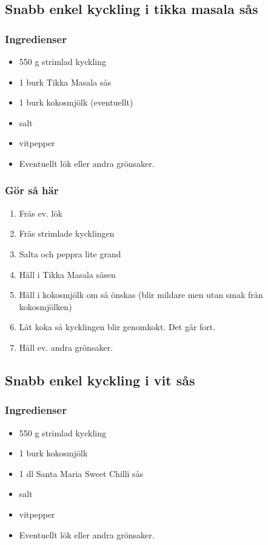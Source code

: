 \documentclass[a4paper,11pt,twocolumn]{article}
\begin{document}
\subsection{Snabb enkel kyckling i tikka masala sås}
\subsubsection*{Ingredienser}
\begin{itemize}[noitemsep]
    \item 550 g strimlad kyckling
    \item 1 burk Tikka Masala sås
    \item 1 burk kokosmjölk (eventuellt)
    \item salt
    \item vitpepper
    \item Eventuellt lök eller andra grönsaker.
\end{itemize}
\subsubsection*{Gör så här}
\begin{enumerate}[label=\arabic*.]
    \item Fräs ev. lök
    \item Fräs strimlade kycklingen
    \item Salta och peppra lite grand
    \item Häll i Tikka Masala såsen
    \item Häll i kokosmjölk om så önskas (blir mildare men utan smak från kokosmjölken)
    \item Låt koka så kycklingen blir genomkokt. Det går fort.
    \item Häll ev. andra grönsaker.
\end{enumerate}


\subsection{Snabb enkel kyckling i vit sås}
\subsubsection*{Ingredienser}
\begin{itemize}[noitemsep]
    \item 550 g strimlad kyckling
    \item 1 burk kokosmjölk
    \item 1 dl Santa Maria Sweet Chilli sås
    \item salt
    \item vitpepper
    \item Eventuellt lök eller andra grönsaker.
\end{itemize}
\end{document}
